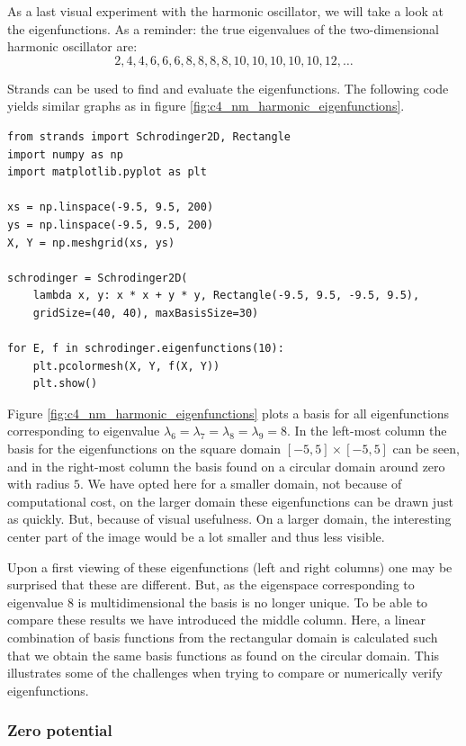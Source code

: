 As a last visual experiment with the harmonic oscillator, we will take a look at the eigenfunctions. As a reminder: the true eigenvalues of the two-dimensional harmonic oscillator are:
$$
    2, 4, 4, 6, 6, 6, 8, 8, 8, 8, 10, 10, 10, 10, 10, 12, \dots
$$

Strands can be used to find and evaluate the eigenfunctions. The following code yields similar graphs as in figure \ref{fig:c4_nm_harmonic_eigenfunctions}.
\begin{verbatim}
from strands import Schrodinger2D, Rectangle
import numpy as np
import matplotlib.pyplot as plt

xs = np.linspace(-9.5, 9.5, 200)
ys = np.linspace(-9.5, 9.5, 200)
X, Y = np.meshgrid(xs, ys)

schrodinger = Schrodinger2D(
    lambda x, y: x * x + y * y, Rectangle(-9.5, 9.5, -9.5, 9.5),
    gridSize=(40, 40), maxBasisSize=30)

for E, f in schrodinger.eigenfunctions(10):
    plt.pcolormesh(X, Y, f(X, Y))
    plt.show()
\end{verbatim}

Figure \ref{fig:c4_nm_harmonic_eigenfunctions} plots a basis for all eigenfunctions corresponding to eigenvalue $\lambda_6 = \lambda_7 = \lambda_8 = \lambda_9 = 8$. In the left-most column the basis for the eigenfunctions on the square domain $[-5, 5] \times [-5, 5]$ can be seen, and in the right-most column the basis found on a circular domain around zero with radius $5$. We have opted here for a smaller domain, not because of computational cost, on the larger domain these eigenfunctions can be drawn just as quickly. But, because of visual usefulness. On a larger domain, the interesting center part of the image would be a lot smaller and thus less visible.

Upon a first viewing of these eigenfunctions (left and right columns) one may be surprised that these are different. But, as the eigenspace corresponding to eigenvalue $8$ is multidimensional the basis is no longer unique. To be able to compare these results we have introduced the middle column. Here, a linear combination of basis functions from the rectangular domain is calculated such that we obtain the same basis functions as found on the circular domain. This illustrates some of the challenges when trying to compare or numerically verify eigenfunctions.

\subsubsection{Zero potential}\label{sec:c4_numerical_zero}

